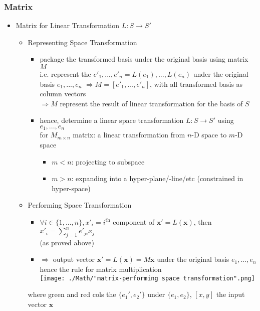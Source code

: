 \subsubsection{Matrix}
\begin{itemize}
\item Matrix for Linear Transformation $L : S\rightarrow S'$
	\begin{itemize}
	\item Representing Space Transformation
		\begin{itemize}
		\item package the transformed basis under the original basis using matrix $M$ \\
		i.e. represent the $e'_1,...,e'_n = L(e_1),...,L(e_n)$ under the original basis $e_1,...,e_n$
		$\Rightarrow M = [e'_1, ..., e'_n]$, with all transformed basis as column vectors \\
		$\Rightarrow M$ represent the result of linear transformation for the basis of $S$
		\item hence, determine a linear space transformation $L:S\rightarrow S'$ using $e_1,...,e_n$ \\
		for $M_{m\times n}$ matrix: a linear transformation from $n$-D space to $m$-D space
			\begin{itemize}
			\item $m<n$: projecting to subspace
			\item $m>n$: expanding into a hyper-plane/-line/etc (constrained in hyper-space)
			\end{itemize}
		\end{itemize}
	\item Performing Space Transformation
		\begin{itemize}
		\item $\displaystyle \forall i\in \{1,...,n\}, x'_i = i^\text{th}$ component of $\mathbf x'=L(\mathbf x)$, then $x'_i = \sum_{j=1}^n e'_{ji}x_j$ \\
		(as proved above)
		\item $\Rightarrow$ output vector $\mathbf x' = L(\mathbf x)=M\mathbf x$ under the original basis $e_1,...,e_n$ \\
		hence the rule for matrix multiplication \\
		\texttt{[image: ./Math/"matrix-performing space transformation".png]}
		\end{itemize}
		where green and red cols the $\{e_1',e_2'\}$ under $\{e_1,e_2\}$, $[x,y]$ the input vector $\mathbf x$
	\end{itemize}


\end{itemize}
